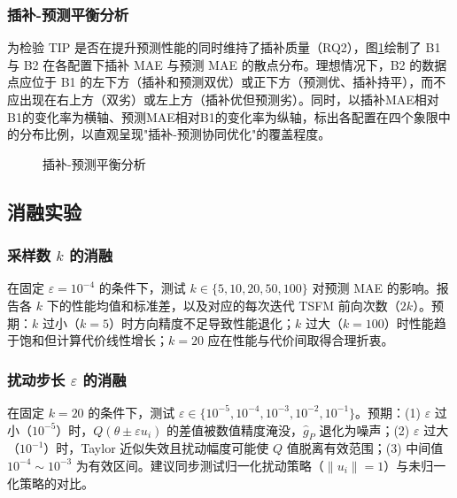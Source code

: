 \documentclass{article}
\begin{document}
\FloatBarrier

\subsubsection{插补-预测平衡分析}\label{sec:imputation_prediction_balance}

为检验 TIP 是否在提升预测性能的同时维持了插补质量（RQ2），图\ref{fig:balance}绘制了 B1 与 B2 在各配置下插补 MAE 与预测 MAE 的散点分布。理想情况下，B2 的数据点应位于 B1 的左下方（插补和预测双优）或正下方（预测优、插补持平），而不应出现在右上方（双劣）或左上方（插补优但预测劣）。同时，以插补MAE相对B1的变化率为横轴、预测MAE相对B1的变化率为纵轴，标出各配置在四个象限中的分布比例，以直观呈现"插补-预测协同优化"的覆盖程度。

\begin{figure}[htbp]
\centering
{}
\caption{插补-预测平衡分析}
\label{fig:balance}
\end{figure}

\subsection{消融实验}\label{sec:ablation}

\subsubsection{采样数 \texorpdfstring{$k$}{k} 的消融}

在固定 $\varepsilon = 10^{-4}$ 的条件下，测试 $k \in \{5, 10, 20, 50, 100\}$ 对预测 MAE 的影响。报告各 $k$ 下的性能均值和标准差，以及对应的每次迭代 TSFM 前向次数（$2k$）。预期：$k$ 过小（$k=5$）时方向精度不足导致性能退化；$k$ 过大（$k=100$）时性能趋于饱和但计算代价线性增长；$k=20$ 应在性能与代价间取得合理折衷。

\subsubsection{扰动步长 \texorpdfstring{$\varepsilon$}{epsilon} 的消融}

在固定 $k=20$ 的条件下，测试 $\varepsilon \in \{10^{-5}, 10^{-4}, 10^{-3}, 10^{-2}, 10^{-1}\}$。预期：(1) $\varepsilon$ 过小（$10^{-5}$）时，$Q(\theta\pm\varepsilon u_i)$ 的差值被数值精度淹没，$\hat{g}_P$ 退化为噪声；(2) $\varepsilon$ 过大（$10^{-1}$）时，Taylor 近似失效且扰动幅度可能使 $Q$ 值脱离有效范围；(3) 中间值 $10^{-4} \sim 10^{-3}$ 为有效区间。建议同步测试归一化扰动策略（$\|u_i\|=1$）与未归一化策略的对比。
\end{document}
